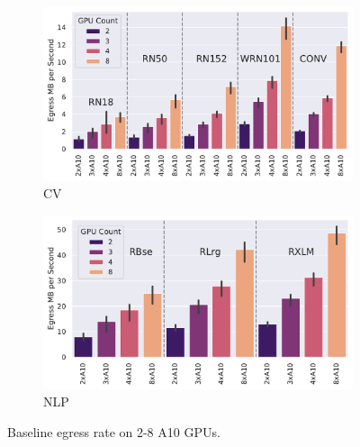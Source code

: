 
\vspace*{-3mm}
\begin{figure}[h]
    \begin{subfigure}[c]{0.225\textwidth}
        \includegraphics[width=\textwidth]{figures/misc/cv_baseline_egress}
        \vspace{-15pt}
        \caption{CV}
        \label{fig:cv-baseline-egress}
    \end{subfigure}
    \begin{subfigure}[c]{0.23\textwidth}
        \includegraphics[width=\textwidth]{figures/misc/nlp_baseline_egress}  
        \vspace{-15pt} 
        \caption{NLP}
        \label{fig:nlp-baseline-egress} 
    \end{subfigure}
    \vspace{-10pt}
    \caption{Baseline egress rate on 2-8 A10 GPUs.}
    \label{fig:baseline-egress}
    \vspace*{-4mm} 
\end{figure} 
 
